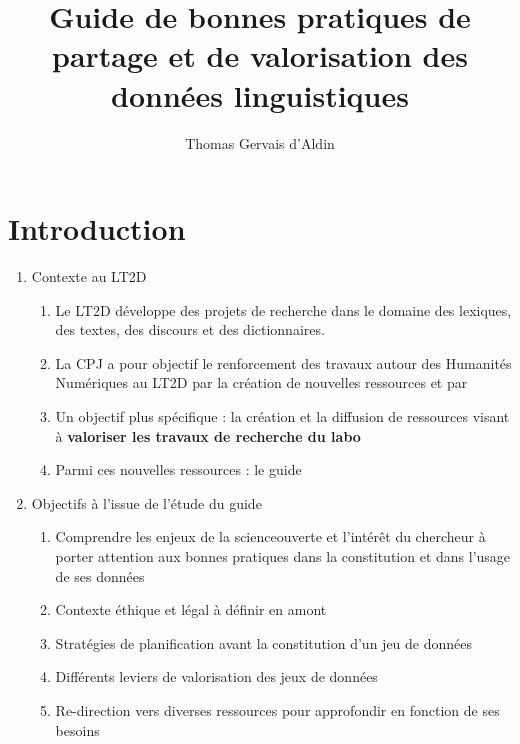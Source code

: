 \documentclass{book}
\title{Guide de bonnes pratiques de partage et de valorisation des données linguistiques}
\author{Thomas Gervais d'Aldin}
\begin{document}

%

\maketitle

\tableofcontents

\clearpage



\chapter*{Introduction}

\begin{enumerate}
	\item Contexte au LT2D
        \begin{enumerate}
            \item Le LT2D développe des projets de recherche dans le domaine des lexiques, des textes, des discours et des dictionnaires.
            \item La CPJ a pour objectif le renforcement des travaux autour des Humanités Numériques au LT2D par la création de nouvelles ressources et par 
            \item Un objectif plus spécifique : la création et la diffusion de ressources visant à \textbf{valoriser les travaux de recherche du labo}
            \item Parmi ces nouvelles ressources : le guide 
        \end{enumerate}
	\item Objectifs à l'issue de l'étude du guide
        \begin{enumerate}
            \item Comprendre les enjeux de la \gls{scienceouverte} et l'intérêt du chercheur à porter attention aux bonnes pratiques dans la constitution et dans l'usage de ses données
            \item Contexte éthique et légal à définir en amont
            \item Stratégies de planification avant la constitution d'un jeu de données
            \item Différents leviers de valorisation des jeux de données
            \item Re-direction vers diverses ressources pour approfondir en fonction de ses besoins
        \end{enumerate}
\end{enumerate}
\end{document}
